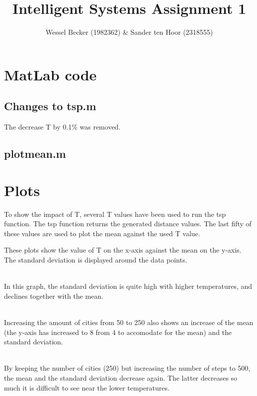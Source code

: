 \documentclass[10pt,a4paper]{article}
\begin{document}
\title{Intelligent Systems Assignment 1}
\author{Wessel Becker (1982362) \& Sander ten Hoor (2318555)}
\maketitle
\section{MatLab code}
\subsection{Changes to tsp.m}
The decrease T by 0.1\% was removed.


\subsection{plotmean.m}


\section{Plots}
To show the impact of T, several T values have been used to run the tsp function. The tsp function returns the generated distance values. The last fifty of these values are used to plot the mean against the used T value.

These plots show the value of T on the x-axis against the mean on the y-axis. The standard deviation is displayed around the data points.

 \\
In this graph, the standard deviation is quite high with higher temperatures, and declines together with the mean. 

 \\
Increasing the amount of cities from 50 to 250 also shows an increase of the mean (the y-axis has increased to 8 from 4 to accomodate for the mean) and the standard deviation.

 \\
By keeping the number of cities (250) but increasing the number of steps to 500, the mean and the standard deviation decrease again. The latter decreases so much it is difficult to see near the lower temperatures.
\end{document}
